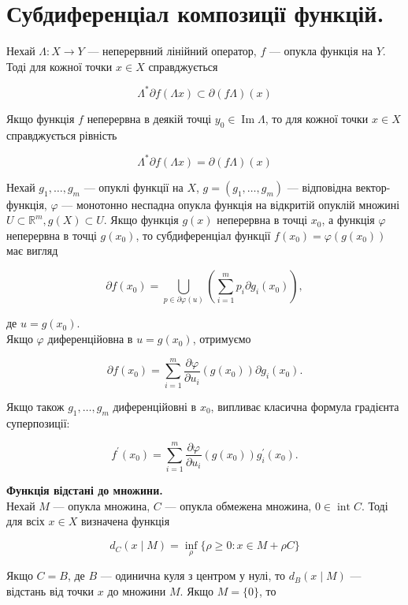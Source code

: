 \documentclass[12pt,a4paper]{extarticle}
\numberwithin{section}{part}
\begin{document}
\section{Субдиференціал композиції функцій.}
Нехай $\Lambda: X \rightarrow Y$ --- неперервний лінійний оператор, $f$ --- опукла функція на $Y$. Тоді для кожної точки $x \in X$ справджується

$$
\Lambda^{*} \partial f(\Lambda x) \subset \partial(f \Lambda)(x)
$$

Якщо функція $f$ неперервна в деякій точці $y_{0} \in \operatorname{Im} \Lambda$, то для кожної точки $x \in X$ справджується рівність

$$
\Lambda^{*} \partial f(\Lambda x)=\partial(f \Lambda)(x)
$$

Нехай $g_{1}, \ldots, g_{m}$ --- опуклі функції на $X$, $g=\left(g_{1}, \ldots, g_{m}\right)$ --- відповідна вектор-функція, $\varphi$ --- монотонно неспадна опукла функція на відкритій опуклій множині $U \subset \mathbb{R}^{m}, g(X) \subset U$. Якщо функція $g(x)$ неперервна в точці $x_{0}$, а функція $\varphi$ неперервна в точці $g\left(x_{0}\right)$, то субдиференціал функції $f\left(x_{0}\right)=\varphi\left(g\left(x_{0}\right)\right)$ має вигляд

$$
\partial f\left(x_{0}\right)=\bigcup_{p \in \partial \varphi(u)}\left(\sum_{i=1}^{m} p_{i} \partial g_{i}\left(x_{0}\right)\right),
$$

де $u=g\left(x_{0}\right)$.\\
Якщо $\varphi$ диференційовна в $u=g\left(x_{0}\right)$, отримуємо

$$
\partial f\left(x_{0}\right)=\sum_{i=1}^{m} \frac{\partial \varphi}{\partial u_{i}}\left(g\left(x_{0}\right)\right) \partial g_{i}\left(x_{0}\right) .
$$

Якщо також $g_{1}, \ldots, g_{m}$ диференційовні в $x_{0}$, випливає класична формула градієнта суперпозиції:

$$
f^{\prime}\left(x_{0}\right)=\sum_{i=1}^{m} \frac{\partial \varphi}{\partial u_{i}}\left(g\left(x_{0}\right)\right) g_{i}^{\prime}\left(x_{0}\right) .
$$

\textbf{Функція відстані до множини.}\\
Нехай $M$ --- опукла множина, $C$ --- опукла обмежена множина, $0 \in \operatorname{int} C$. Тоді для всіх $x \in X$ визначена функція

$$
d_{C}(x \mid M)=\inf _{\rho}\{\rho \geq 0: x \in M+\rho C\}
$$

Якщо $C=B$, де $B$ --- одинична куля з центром у нулі, то $d_{B}(x \mid M)$ --- відстань від точки $x$ до множини $M$. Якщо $M=\{0\}$, то
\end{document}
